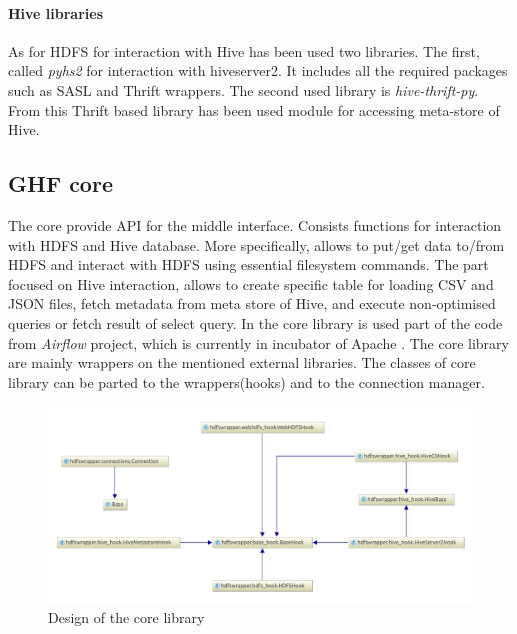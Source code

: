 \documentclass[a4paper,12pt,oneside]{report}
\begin{document}
\paragraph{Hive libraries}
As for HDFS for interaction with Hive has been used two libraries. The first, called \textit{pyhs2} for interaction with hiveserver2. It includes all the required packages such as SASL and Thrift wrappers. The second used library is \textit{hive-thrift-py}. From this Thrift based library has been used module for accessing meta-store of Hive.

\subsection{GHF core}
The core provide API for the middle interface. Consists functions for interaction with HDFS and Hive database. More specifically, allows to put/get data to/from HDFS and interact with HDFS using essential filesystem commands. The part focused on Hive interaction, allows to create specific table for loading CSV and JSON files, fetch metadata from meta store of Hive, and execute non-optimised queries or fetch result of select query. In the core library is used part of the code from \textit{Airflow} project, which is currently in incubator of Apache \cite{airflow_diff}. The core library are mainly wrappers on the mentioned external libraries. The classes of core library can be parted to the  wrappers(hooks) and to the connection manager. 

\begin{figure}[!htbp]
   \centering
   \includegraphics[width=1\textwidth]{./img/diag1_small.pdf}
   \caption[Core diagram]{\centering Design of the core library }
\end{figure} 
\end{document}
